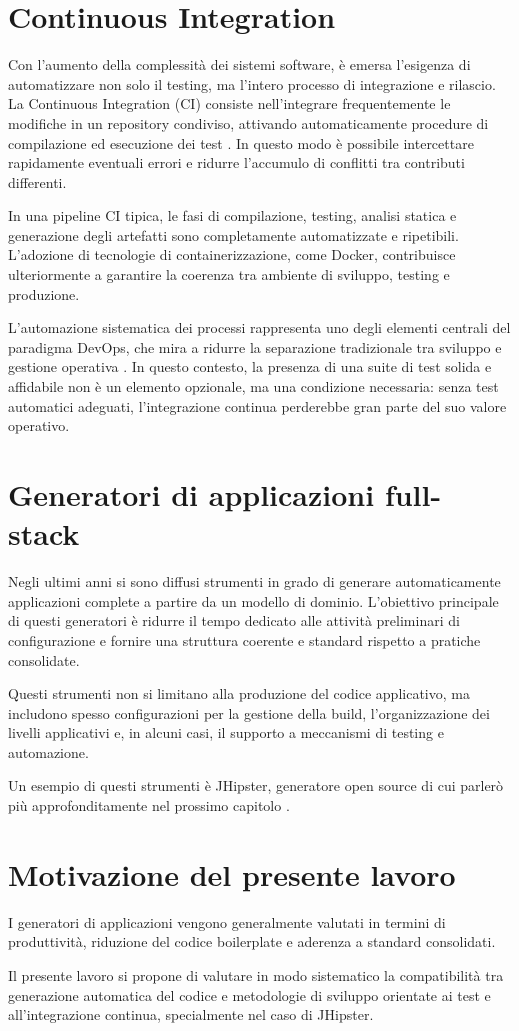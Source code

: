 \section{Continuous Integration}

Con l’aumento della complessità dei sistemi software, è emersa l’esigenza di automatizzare non solo il testing, ma l’intero processo di integrazione e rilascio. La Continuous Integration (CI) consiste nell’integrare frequentemente le modifiche in un repository condiviso, attivando automaticamente procedure di compilazione ed esecuzione dei test \cite{Fowler2006CI,BettiniTDD}. In questo modo è possibile intercettare rapidamente eventuali errori e ridurre l’accumulo di conflitti tra contributi differenti.

In una pipeline CI tipica, le fasi di compilazione, testing, analisi statica e generazione degli artefatti sono completamente automatizzate e ripetibili. L’adozione di tecnologie di containerizzazione, come Docker, contribuisce ulteriormente a garantire la coerenza tra ambiente di sviluppo, testing e produzione.

L’automazione sistematica dei processi rappresenta uno degli elementi centrali del paradigma DevOps, che mira a ridurre la separazione tradizionale tra sviluppo e gestione operativa \cite{HumbleFarley2010}. In questo contesto, la presenza di una suite di test solida e affidabile non è un elemento opzionale, ma una condizione necessaria: senza test automatici adeguati, l’integrazione continua perderebbe gran parte del suo valore operativo.

\section{Generatori di applicazioni full-stack}

Negli ultimi anni si sono diffusi strumenti in grado di generare automaticamente applicazioni complete a partire da un modello di dominio. L’obiettivo principale di questi generatori è ridurre il tempo dedicato alle attività preliminari di configurazione e fornire una struttura coerente e standard rispetto a pratiche consolidate.

Questi strumenti non si limitano alla produzione del codice applicativo, ma includono spesso configurazioni per la gestione della build, l’organizzazione dei livelli applicativi e, in alcuni casi, il supporto a meccanismi di testing e automazione.

Un esempio di questi strumenti è JHipster, generatore open source di cui parlerò più approfonditamente nel prossimo capitolo \cite{JHipsterDocs}.

\section{Motivazione del presente lavoro}

I generatori di applicazioni vengono generalmente valutati in termini di produttività, riduzione del codice boilerplate e aderenza a standard consolidati.

Il presente lavoro si propone di valutare in modo sistematico la compatibilità tra generazione automatica del codice e metodologie di sviluppo orientate ai test e all’integrazione continua, specialmente nel caso di JHipster.